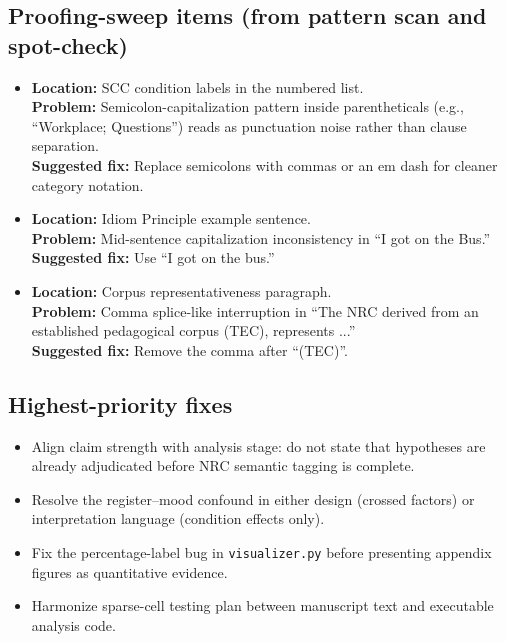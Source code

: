 \documentclass[11pt]{article}
\begin{document}
\subsection*{Proofing-sweep items (from pattern scan and spot-check)}

\begin{itemize}
\item \textbf{Location:} SCC condition labels in the numbered list.\\
\textbf{Problem:} Semicolon-capitalization pattern inside parentheticals (e.g., ``Workplace; Questions'') reads as punctuation noise rather than clause separation.\\
\textbf{Suggested fix:} Replace semicolons with commas or an em dash for cleaner category notation.

\item \textbf{Location:} Idiom Principle example sentence.\\
\textbf{Problem:} Mid-sentence capitalization inconsistency in ``I got on the Bus.''\\
\textbf{Suggested fix:} Use ``I got on the bus.''

\item \textbf{Location:} Corpus representativeness paragraph.\\
\textbf{Problem:} Comma splice-like interruption in ``The NRC derived from an established pedagogical corpus (TEC), represents ...''\\
\textbf{Suggested fix:} Remove the comma after ``(TEC)''.
\end{itemize}

\subsection*{Highest-priority fixes}

\begin{itemize}
\item Align claim strength with analysis stage: do not state that hypotheses are already adjudicated before NRC semantic tagging is complete.
\item Resolve the register--mood confound in either design (crossed factors) or interpretation language (condition effects only).
\item Fix the percentage-label bug in \texttt{visualizer.py} before presenting appendix figures as quantitative evidence.
\item Harmonize sparse-cell testing plan between manuscript text and executable analysis code.
\end{itemize}
\end{document}

